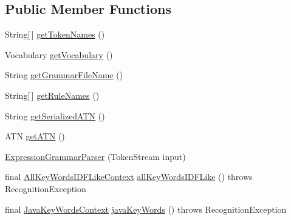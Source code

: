 \subsection*{Public Member Functions}
\begin{DoxyCompactItemize}
\item 
String\mbox{[}$\,$\mbox{]} \hyperlink{classgov_1_1nasa_1_1jpf_1_1inspector_1_1server_1_1expression_1_1parser_1_1_expression_grammar_parser_a05cf708586dd715974f144435cec7e83}{get\+Token\+Names} ()
\item 
Vocabulary \hyperlink{classgov_1_1nasa_1_1jpf_1_1inspector_1_1server_1_1expression_1_1parser_1_1_expression_grammar_parser_a992c4b942b9c12696c13172f8cb9e7d4}{get\+Vocabulary} ()
\item 
String \hyperlink{classgov_1_1nasa_1_1jpf_1_1inspector_1_1server_1_1expression_1_1parser_1_1_expression_grammar_parser_ad970fd65fb1fd7e77fd3d8c791bc194e}{get\+Grammar\+File\+Name} ()
\item 
String\mbox{[}$\,$\mbox{]} \hyperlink{classgov_1_1nasa_1_1jpf_1_1inspector_1_1server_1_1expression_1_1parser_1_1_expression_grammar_parser_a0a00371154a50ac396fcd5228bc7d627}{get\+Rule\+Names} ()
\item 
String \hyperlink{classgov_1_1nasa_1_1jpf_1_1inspector_1_1server_1_1expression_1_1parser_1_1_expression_grammar_parser_a2db2bbfbe257a0832959e7c45574290d}{get\+Serialized\+A\+TN} ()
\item 
A\+TN \hyperlink{classgov_1_1nasa_1_1jpf_1_1inspector_1_1server_1_1expression_1_1parser_1_1_expression_grammar_parser_a36d5794d8d40740ade0e5cabcc63266d}{get\+A\+TN} ()
\item 
\hyperlink{classgov_1_1nasa_1_1jpf_1_1inspector_1_1server_1_1expression_1_1parser_1_1_expression_grammar_parser_a05cf029a703ff2dedab18659e49a5837}{Expression\+Grammar\+Parser} (Token\+Stream input)
\item 
final \hyperlink{classgov_1_1nasa_1_1jpf_1_1inspector_1_1server_1_1expression_1_1parser_1_1_expression_grammar_pad664d42a2aee14226e172b869b9ffb3b}{All\+Key\+Words\+I\+D\+F\+Like\+Context} \hyperlink{classgov_1_1nasa_1_1jpf_1_1inspector_1_1server_1_1expression_1_1parser_1_1_expression_grammar_parser_abed0177f437ea92b0f2f8165987fdf59}{all\+Key\+Words\+I\+D\+F\+Like} ()  throws Recognition\+Exception 
\item 
final \hyperlink{classgov_1_1nasa_1_1jpf_1_1inspector_1_1server_1_1expression_1_1parser_1_1_expression_grammar_parser_1_1_java_key_words_context}{Java\+Key\+Words\+Context} \hyperlink{classgov_1_1nasa_1_1jpf_1_1inspector_1_1server_1_1expression_1_1parser_1_1_expression_grammar_parser_ad2052f91a11b56131e3a746447f36634}{java\+Key\+Words} ()  throws Recognition\+Exception 

\end{DoxyCompactItemize}
